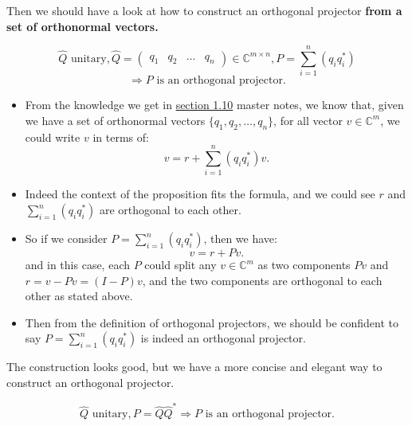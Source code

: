 \noindent Then we should have a look at how to construct an orthogonal projector \textbf{from a set of orthonormal vectors.} 

\begin{prop}
  \[
    \hat{Q} \text{ unitary}, \hat{Q} = \begin{pmatrix} q_1 & q_2 & \ldots & q_n \end{pmatrix} \in \mathbb{C}^{m \times n}, P = \sum_{i=1}^{n} (q_iq_i^{*}) 
  \]
  \[
    \Rightarrow P \text{ is an orthogonal projector} 
  .\]
\end{prop}
\begin{itemize}
\item From the knowledge we get in \href{https://comp-lin-alg.github.io/L1_preliminaries.html#constructing-orthogonal-projectors-from-sets-of-orthonormal-vectors}{section 1.10} master notes, we know that, given we have a set of orthonormal vectors $\{q_1, q_2, \ldots, q_n\}$, for all vector $v \in \mathbb{C}^{m}$, we could write $v$ in terms of:
  \[
    v = r + \sum_{i = 1}^{n} (q_iq_i^{*})v
  .\] 
\item Indeed the context of the proposition fits the formula, and we could see \(r\) and \(\sum_{i=1}^{n} (q_iq_i^{*})\) are orthogonal to each other.  
  \item So if we consider $P = \sum_{i=1}^{n} (q_iq_i^{*})$, then we have:
    \[
    v = r + Pv
    .\] 
    and in this case, each \(P\) could split any \(v \in \mathbb{C}^{m}\) as two components \(Pv\) and \(r = v - Pv = (I - P)v\), and the two components are orthogonal to each other as stated above. 
  \item Then from the definition of orthogonal projectors, we should be confident to say \(P = \sum_{i=1}^{n} (q_iq_i^{*})\) is indeed an orthogonal projector.  \checked
\end{itemize}
The construction looks good, but we have a more concise and elegant way to construct an orthogonal projector.
\newpage
\begin{corollary}
  \[
  \hat{Q} \text{ unitary}, P = \hat{Q}\hat{Q}^{*} \Rightarrow P \text{ is an orthogonal projector}
  .\] 
\end{corollary}

